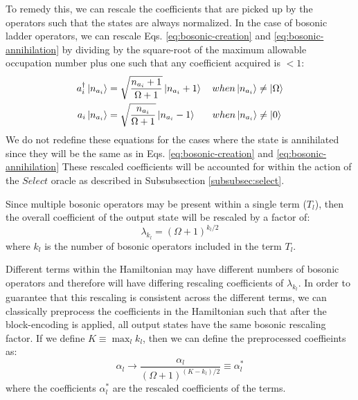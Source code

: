 To remedy this, we can rescale the coefficients that are picked up by the operators such that the states are always normalized.
In the case of bosonic ladder operators, we can rescale Eqs. \ref{eq:bosonic-creation} and \ref{eq:bosonic-annihilation} by dividing by the square-root of the maximum allowable occupation number plus one such that any coefficient acquired is $< 1$:
\begin{equation}
    \begin{split}
        a_i^\dagger \ket{n_{a_i}} &= \sqrt{\frac{n_{a_i} + 1}{\Omega + 1}} \ket{n_{a_i} + 1} \hspace{1em} when \ket{n_{a_i}} \neq \ket{\Omega} \\
        a_i  \ket{n_{a_i}} &= \sqrt{\frac{n_{a_i}}{\Omega + 1}} \ket{n_{a_i} - 1} \hspace{1.7em} when \ket{n_{a_i}} \neq \ket{0}
    \end{split}
\end{equation}
We do not redefine these equations for the cases where the state is annihilated since they will be the same as in Eqs.  \ref{eq:bosonic-creation} and \ref{eq:bosonic-annihilation}
These rescaled coefficients will be accounted for within the action of the $Select$ oracle as described in Subsubsection \ref{subsubsec:select}.

Since multiple bosonic operators may be present within a single term ($T_l$), then the overall coefficient of the output state will be rescaled by a factor of:
\begin{equation}
    \lambda_{k_l} = (\Omega + 1)^{k_l/2}
\end{equation}
where $k_l$ is the number of bosonic operators included in the term $T_l$.

Different terms within the Hamiltonian may have different numbers of bosonic operators and therefore will have differing rescaling coefficients of $\lambda_{k_l}$.
In order to guarantee that this rescaling is consistent across the different terms, we can classically preprocess the coefficients in the Hamiltonian such that after the block-encoding is applied, all output states have the same bosonic rescaling factor.
If we define $K \equiv \max_l{k_l}$, then we can define the preprocessed coeffieints as:
\begin{equation}
    \alpha_l \rightarrow \frac{\alpha_l}{(\Omega + 1)^{(K - k_l)/2}} \equiv \alpha_l^*
\end{equation}
where the coefficients $\alpha_l^*$ are the rescaled coefficients of the terms.


